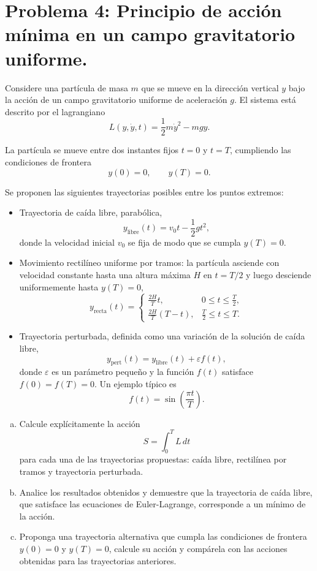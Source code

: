 \documentclass[a4paper]{article}
\begin{document}
\section{Problema 4: Principio de acción mínima en un campo gravitatorio uniforme.}

Considere una partícula de masa $m$ que se mueve en la dirección vertical $y$ bajo la acción de un campo gravitatorio uniforme de aceleración $g$. El sistema está descrito por el lagrangiano
$$L(y, \dot{y}, t) = \frac{1}{2}m\dot{y}^2 - mgy.$$

La partícula se mueve entre dos instantes fijos $t = 0$ y $t = T$, cumpliendo las condiciones de frontera
$$y(0) = 0, \qquad y(T) = 0.$$

Se proponen las siguientes trayectorias posibles entre los puntos extremos:
\begin{itemize}
    \item Trayectoria de caída libre, parabólica,
    $$y_{\text{libre}}(t) = v_0t - \frac{1}{2}gt^2,$$
    donde la velocidad inicial $v_0$ se fija de modo que se cumpla $y(T) = 0$.
    
    \item Movimiento rectilíneo uniforme por tramos: la partícula asciende con velocidad constante hasta una altura máxima $H$ en $t = T/2$ y luego desciende uniformemente hasta $y(T) = 0$,
    $$y_{\text{recta}}(t) = \begin{cases} 
        \frac{2H}{T}t, & 0 \le t \le \frac{T}{2}, \\ 
        \frac{2H}{T}(T - t), & \frac{T}{2} \le t \le T. 
    \end{cases}$$
    
    \item Trayectoria perturbada, definida como una variación de la solución de caída libre,
    $$y_{\text{pert}}(t) = y_{\text{libre}}(t) + \varepsilon f(t),$$
    donde $\varepsilon$ es un parámetro pequeño y la función $f(t)$ satisface $f(0) = f(T) = 0$. Un ejemplo típico es
    $$f(t) = \sin\left(\frac{\pi t}{T}\right).$$
\end{itemize}

\begin{enumerate}[a)]
    \item Calcule explícitamente la acción
    $$S = \int_{0}^{T} L \, dt$$
    para cada una de las trayectorias propuestas: caída libre, rectilínea por tramos y trayectoria perturbada.
    
    \item Analice los resultados obtenidos y demuestre que la trayectoria de caída libre, que satisface las ecuaciones de Euler-Lagrange, corresponde a un mínimo de la acción.
    
    \item Proponga una trayectoria alternativa que cumpla las condiciones de frontera $y(0) = 0$ y $y(T) = 0$, calcule su acción y compárela con las acciones obtenidas para las trayectorias anteriores.
\end{enumerate}
\end{document}
